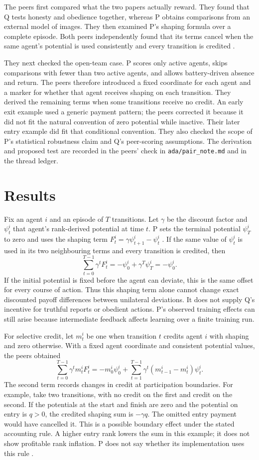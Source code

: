 \documentclass{article}
\begin{document}
The peers first compared what the two papers actually reward. They found that Q tests honesty and obedience together, whereas P obtains comparisons from an external model of images. They then examined P's shaping formula over a complete episode. Both peers independently found that its terms cancel when the same agent's potential is used consistently and every transition is credited \cite{Q,P}.

They next checked the open-team case. P scores only active agents, skips comparisons with fewer than two active agents, and allows battery-driven absence and return. The peers therefore introduced a fixed coordinate for each agent and a marker for whether that agent receives shaping on each transition. They derived the remaining terms when some transitions receive no credit. An early exit example used a generic payment pattern; the peers corrected it because it did not fit the natural convention of zero potential while inactive. Their later entry example did fit that conditional convention. They also checked the scope of P's statistical robustness claim and Q's peer-scoring assumptions. The derivation and proposed test are recorded in the peers' check in \texttt{ada/pair\_note.md} and in the thread ledger.

\section{Results}

Fix an agent \(i\) and an episode of \(T\) transitions. Let \(\gamma\) be the discount factor and \(\psi_t^i\) that agent's rank-derived potential at time \(t\). P sets the terminal potential \(\psi_T^i\) to zero and uses the shaping term \(F_t^i=\gamma\psi_{t+1}^i-\psi_t^i\) \cite{P}. If the same value of \(\psi_t^i\) is used in its two neighbouring terms and every transition is credited, then
\[
\sum_{t=0}^{T-1}\gamma^t F_t^i
=-\psi_0^i+\gamma^T\psi_T^i
=-\psi_0^i.
\]
If the initial potential is fixed before the agent can deviate, this is the same offset for every course of action. Thus this shaping term alone cannot change exact discounted payoff differences between unilateral deviations. It does not supply Q's incentive for truthful reports or obedient actions. P's observed training effects can still arise because intermediate feedback affects learning over a finite training run.

For selective credit, let \(m_t^i\) be one when transition \(t\) credits agent \(i\) with shaping and zero otherwise. With a fixed agent coordinate and consistent potential values, the peers obtained
\[
\sum_{t=0}^{T-1}\gamma^t m_t^i F_t^i
=-m_0^i\psi_0^i
+\sum_{t=1}^{T-1}\gamma^t(m_{t-1}^i-m_t^i)\psi_t^i.
\]
The second term records changes in credit at participation boundaries. For example, take two transitions, with no credit on the first and credit on the second. If the potentials at the start and finish are zero and the potential on entry is \(q>0\), the credited shaping sum is \(-\gamma q\). The omitted entry payment would have cancelled it. This is a possible boundary effect under the stated accounting rule. A higher entry rank lowers the sum in this example; it does not show profitable rank inflation. P does not say whether its implementation uses this rule \cite{P}.
\end{document}
